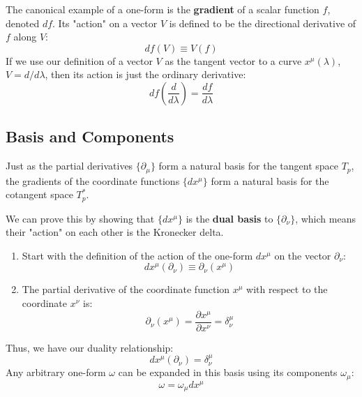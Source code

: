 \documentclass[11pt, a4paper]{report}
\begin{document}
The canonical example of a one-form is the \textbf{gradient} of a scalar function $f$, denoted $df$. Its "action" on a vector $V$ is defined to be the directional derivative of $f$ along $V$:
\[
    df(V) \equiv V(f)
\]
If we use our definition of a vector $V$ as the tangent vector to a curve $x^\mu(\lambda)$, $V = d/d\lambda$, then its action is just the ordinary derivative:
\begin{equation}
    df\left(\frac{d}{d\lambda}\right) = \frac{df}{d\lambda}
\end{equation}

\subsection*{Basis and Components}
Just as the partial derivatives $\{\partial_\mu\}$ form a natural basis for the tangent space $T_p$, the gradients of the coordinate functions $\{dx^\mu\}$ form a natural basis for the cotangent space $T_p^*$.

We can prove this by showing that $\{dx^\mu\}$ is the \textbf{dual basis} to $\{\partial_\nu\}$, which means their "action" on each other is the Kronecker delta.
\begin{enumerate}
    \item Start with the definition of the action of the one-form $dx^\mu$ on the vector $\partial_\nu$:
    \[
        dx^\mu (\partial_\nu) \equiv \partial_\nu (x^\mu)
    \]
    \item The partial derivative of the coordinate function $x^\mu$ with respect to the coordinate $x^\nu$ is:
    \[
        \partial_\nu (x^\mu) = \frac{\partial x^\mu}{\partial x^\nu} = \delta^\mu_\nu
    \]
\end{enumerate}
Thus, we have our duality relationship:
\begin{equation}
    dx^\mu (\partial_\nu) = \delta^\mu_\nu
\end{equation}
Any arbitrary one-form $\omega$ can be expanded in this basis using its components $\omega_\mu$:
\[
    \omega = \omega_\mu dx^\mu
\]
\end{document}
